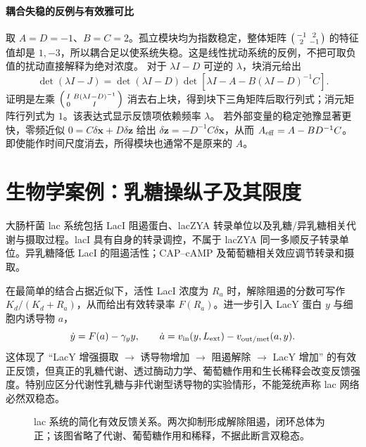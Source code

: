 \documentclass[11pt,a4paper,UTF8,fontset=fandol]{ctexart}
\begin{document}
\paragraph{耦合失稳的反例与有效雅可比}
取 $A=D=-1$、$B=C=2$。孤立模块均为指数稳定，整体矩阵
$\begin{psmallmatrix}-1&2\\2&-1\end{psmallmatrix}$ 的特征值却是 $1,-3$，所以耦合足以使系统失稳。这是线性扰动系统的反例，不把可取负值的扰动直接解释为绝对浓度。
对于 $\lambda I-D$ 可逆的 $\lambda$，块消元给出
\[
\det(\lambda I-J)=\det(\lambda I-D)
\det\left[\lambda I-A-B(\lambda I-D)^{-1}C\right].
\]
证明是左乘 $\begin{psmallmatrix}I&B(\lambda I-D)^{-1}\\0&I\end{psmallmatrix}$ 消去右上块，得到块下三角矩阵后取行列式；消元矩阵行列式为 $1$。该表达式显示反馈项依赖频率 $\lambda$。
若外部变量的稳定弛豫显著更快，零频近似 $0=C\delta\bm x+D\delta\bm z$ 给出 $\delta\bm z=-D^{-1}C\delta\bm x$，从而 $A_{\rm eff}=A-BD^{-1}C$。即使能作时间尺度消去，所得模块也通常不是原来的 $A$。


\section{生物学案例：乳糖操纵子及其限度}
大肠杆菌 lac 系统包括 LacI 阻遏蛋白、lacZYA 转录单位以及乳糖/异乳糖相关代谢与摄取过程。lacI 具有自身的转录调控，不属于 lacZYA 同一多顺反子转录单位。异乳糖降低 LacI 的阻遏活性；CAP--cAMP 及葡萄糖相关效应调节转录和摄取。

在最简单的结合占据近似下，活性 LacI 浓度为 $R_a$ 时，解除阻遏的分数可写作 $K_d/(K_d+R_a)$，从而给出有效转录率 $F(R_a)$。进一步引入 LacY 蛋白 $y$ 与细胞内诱导物 $a$，
\begin{equation}\dot y=F(a)-\gamma_y y,\qquad\dot a=v_{\rm in}(y,L_{\rm ext})-v_{\rm out/met}(a,y).\end{equation}
这体现了 ``LacY 增强摄取 $\to$ 诱导物增加 $\to$ 阻遏解除 $\to$ LacY 增加'' 的有效正反馈，但真正的乳糖代谢、透过酶动力学、葡萄糖作用和生长稀释会改变反馈强度。特别应区分代谢性乳糖与非代谢型诱导物的实验情形，不能笼统声称 lac 网络必然双稳态。


\begin{figure}[htbp]\centering
{}
\caption{lac 系统的简化有效反馈关系。两次抑制形成解除阻遏，闭环总体为正；该图省略了代谢、葡萄糖作用和稀释，不据此断言双稳态。}
\end{figure}
\end{document}
